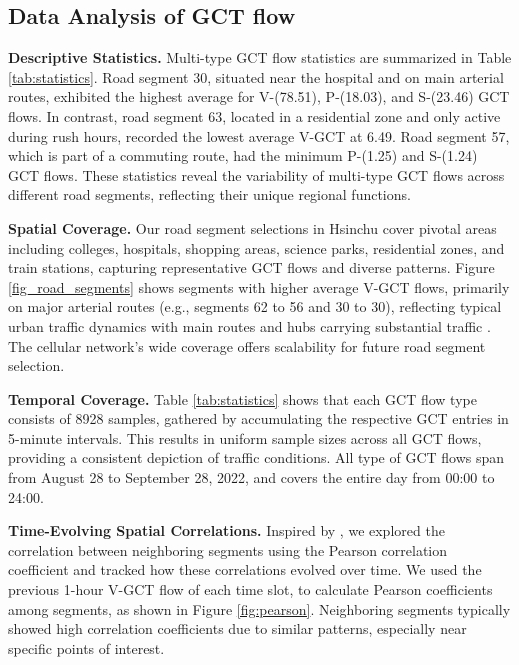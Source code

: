 \documentclass[letterpaper]{article} %
\begin{document}
\subsection{Data Analysis of GCT flow}
\label{Data_Analysis}
\noindent \textbf{Descriptive Statistics.} Multi-type GCT flow statistics are summarized in Table \ref{tab:statistics}. Road segment 30, situated near the hospital and on main arterial routes, exhibited the highest average for V-(78.51), P-(18.03), and S-(23.46) GCT flows. In contrast, road segment 63, located in a residential zone and only active during rush hours, recorded the lowest average V-GCT at 6.49. Road segment 57, which is part of a commuting route, had the minimum P-(1.25) and S-(1.24) GCT flows. These statistics reveal the variability of multi-type GCT flows across different road segments, reflecting their unique regional functions.

\noindent \textbf{Spatial Coverage.} Our road segment selections in Hsinchu cover pivotal areas including colleges, hospitals, shopping areas, science parks, residential zones, and train stations, capturing representative GCT flows and diverse patterns. Figure \ref{fig_road_segments} shows segments with higher average V-GCT flows, primarily on major arterial routes (e.g., segments 62 to 56 and 30 to 30), reflecting typical urban traffic dynamics with main routes and hubs carrying substantial traffic \cite{peng2016computational,babu2020toward}. The cellular network's wide coverage offers scalability for future road segment selection. 

\noindent \textbf{Temporal Coverage.} Table \ref{tab:statistics} shows that each GCT flow type consists of 8928 samples, gathered by accumulating the respective GCT entries in 5-minute intervals. This results in uniform sample sizes across all GCT flows, providing a consistent depiction of traffic conditions. All type of GCT flows span from August 28 to September 28, 2022, and covers the entire day from 00:00 to 24:00.

\noindent \textbf{Time-Evolving Spatial Correlations.}
Inspired by \cite{zhang2018citywide,wang2021modeling}, we explored the correlation between neighboring segments using the Pearson correlation coefficient \cite{cohen2009pearson} and tracked how these correlations evolved over time. We used the previous 1-hour V-GCT flow of each time slot, to calculate Pearson coefficients among segments, as shown in Figure \ref{fig:pearson}. Neighboring segments typically showed high correlation coefficients due to similar patterns, especially near specific points of interest. 
\end{document}
